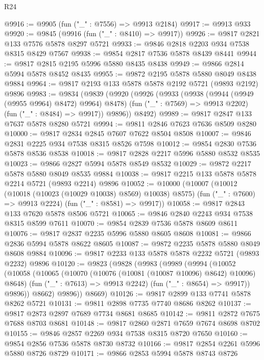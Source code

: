 \begin{lexlean}{R24}
\begin{coremodule}
@9916 := @9905 (fun ("_" : @7556) => @9913 @2184)
@9917 := @9913 @933
@9920 := @9845 (@9916 (fun ("_" : @8410) => @9917))
@9926 := @9817 @2821 @133 @7576 @5878 @8297 @5721
@9933 := @9846 @2818 @2203 @934 @7538 @8315 @8429 @7567
@9938 := @9854 @2817 @7536 @5878 @8439 @8441
@9944 := @9817 @2815 @2195 @5996 @5880 @8435 @8438
@9949 := @9866 @2814 @5994 @5878 @8452 @8435
@9955 := @9872 @2195 @5878 @5880 @8049 @8438 @9884
@9964 := @9817 @2193 @133 @5878 @5878 @2192 @5721 (@9893 @2192) @9896
@9983 := @9834
    (@9839
      (@9920
        (@9926
          (@9933
            (@9938 (@9944 (@9949 (@9955 @9964) @8472) @9964) @8478)
            (fun ("_" : @7569) => @9913 @2202)
            (fun ("_" : @8484) => @9917))
          @9896))
      @8492)
@9989 := @9817 @2847 @133 @7637 @5878 @8280 @5721
@9994 := @9811 @2846 @7623 @7636 @8509 @8280
@10000 := @9817 @2834 @2845 @7607 @7622 @8504 @8508
@10007 := @9846 @2831 @2225 @934 @7538 @8315 @8526 @7598
@10012 := @9854 @2830 @7536 @5878 @8536 @8538
@10018 := @9817 @2828 @2217 @5996 @5880 @8532 @8535
@10023 := @9866 @2827 @5994 @5878 @8549 @8532
@10029 := @9872 @2217 @5878 @5880 @8049 @8535 @9884
@10038 := @9817 @2215 @133 @5878 @5878 @2214 @5721 (@9893 @2214) @9896
@10052 := @10000
    (@10007
      (@10012 (@10018 (@10023 (@10029 @10038) @8569) @10038) @8575)
      (fun ("_" : @7600) => @9913 @2224)
      (fun ("_" : @8581) => @9917))
@10058 := @9817 @2843 @133 @7620 @5878 @8506 @5721
@10065 := @9846 @2840 @2243 @934 @7538 @8315 @8599 @7611
@10070 := @9854 @2839 @7536 @5878 @8609 @8611
@10076 := @9817 @2837 @2235 @5996 @5880 @8605 @8608
@10081 := @9866 @2836 @5994 @5878 @8622 @8605
@10087 := @9872 @2235 @5878 @5880 @8049 @8608 @9884
@10096 := @9817 @2233 @133 @5878 @5878 @2232 @5721 (@9893 @2232) @9896
@10120 := @9823
    (@9828
      (@9983
        (@9989
          (@9994
            (@10052
              (@10058
                (@10065
                  (@10070 (@10076 (@10081 (@10087 @10096) @8642) @10096) @8648)
                  (fun ("_" : @7613) => @9913 @2242)
                  (fun ("_" : @8654) => @9917))
                @9896))
            @8662)
          @9896))
      @8669)
@10126 := @9817 @2899 @133 @7741 @5878 @8262 @5721
@10131 := @9811 @2898 @7735 @7740 @8686 @8262
@10137 := @9817 @2873 @2897 @7689 @7734 @8681 @8685
@10142 := @9811 @2872 @7675 @7688 @8703 @8681
@10148 := @9817 @2860 @2871 @7659 @7674 @8698 @8702
@10155 := @9846 @2857 @2269 @934 @7538 @8315 @8720 @7650
@10160 := @9854 @2856 @7536 @5878 @8730 @8732
@10166 := @9817 @2854 @2261 @5996 @5880 @8726 @8729
@10171 := @9866 @2853 @5994 @5878 @8743 @8726

\end{coremodule}
\end{lexlean}
